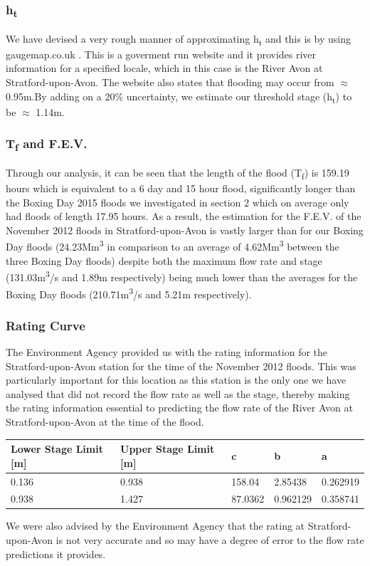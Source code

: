 \documentclass[11 pt, a4paper]{article}
\begin{document}
\subsubsection{h\textsubscript{t}}
We have devised a very rough manner of approximating h\textsubscript{t} and this is by using gaugemap.co.uk \cite{6}. This is a goverment run website and it provides river information for a specified locale, which in this case is the River Avon at Stratford-upon-Avon. The website also states that flooding may occur from $\approx$ 0.95m.By adding on a 20\% uncertainty, we estimate our threshold stage (h\textsubscript{t}) to be $\approx$ 1.14m.
\subsubsection{T\textsubscript{f} and F.E.V.}
Through our analysis, it can be seen that the length of the flood (T\textsubscript{f}) is 159.19 hours which is equivalent to a 6 day and 15 hour flood, significantly longer than the Boxing Day 2015 floods we investigated in section 2 which on average only had floods of length 17.95 hours. As a result, the estimation for the F.E.V. of the November 2012 floods in Stratford-upon-Avon is vastly larger than for our Boxing Day floods (24.23Mm\textsuperscript{3} in comparison to an average of 4.62Mm\textsuperscript{3} between the three Boxing Day floods) despite both the maximum flow rate and stage (131.03m\textsuperscript{3}/s and 1.89m respectively) being much lower than the averages for the Boxing Day floods (210.71m\textsuperscript{3}/s and 5.21m respectively).
\subsubsection{Rating Curve}
The Environment Agency provided us with the rating information for the Stratford-upon-Avon station for the time of the November 2012 floods. This was particularly important for this location as this station is the only one we have analysed that did not record the flow rate as well as the stage, thereby making the rating information essential to predicting the flow rate of the River Avon at Stratford-upon-Avon at the time of the flood.\\
\begin{center}
\begin{tabular}{|l|l|l|l|l|}
\hline
Lower Stage Limit {[}m{]} & Upper Stage Limit {[}m{]} & c & b & a \\
\hline
0.136 & 0.938 & 158.04 & 2.85438 & 0.262919 \\
0.938 & 1.427 & 87.0362 & 0.962129 & 0.358741 \\
\hline
\end{tabular}
\end{center}
We were also advised by the Environment Agency that the rating at Stratford-upon-Avon is not very accurate and so may have a degree of error to the flow rate predictions it provides.
\end{document}
